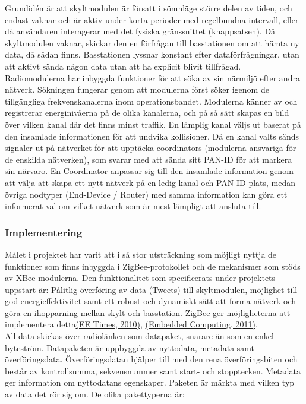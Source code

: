 \documentclass[a4paper,11pt]{article}
\begin{document}
Grundidén är att skyltmodulen är försatt i sömnläge större delen av tiden, och endast vaknar och är aktiv under korta perioder med regelbundna intervall, eller då användaren interagerar med det fysiska gränssnittet (knappsatsen). Då skyltmodulen vaknar, skickar den en förfrågan till basstationen om att hämta ny data, då sådan finns. Basstationen lyssnar konstant efter dataförfrågningar, utan att aktivt sända någon data utan att ha explicit blivit tillfrågad. \\

Radiomodulerna har inbyggda funktioner för att söka av sin närmiljö efter andra nätverk. Sökningen fungerar genom att modulerna först söker igenom de tillgängliga frekvenskanalerna inom operationsbandet. Modulerna känner av och registrerar energinivåerna på de olika kanalerna, och på så sätt skapas en bild över vilken kanal där det finns minst traffik. En lämplig kanal väljs ut baserat på den insamlade informationen för att undvika kollisioner. Då en kanal valts sänds signaler ut på nätverket för att upptäcka coordinators (modulerna ansvariga för de enskilda nätverken), som svarar med att sända sitt PAN-ID för att markera sin närvaro. En Coordinator anpassar sig till den insamlade information genom att välja att skapa ett nytt nätverk på en ledig kanal och PAN-ID-plats, medan övriga nodtyper (End-Device / Router) med samma information kan göra ett informerat val om vilket nätverk som är mest lämpligt att ansluta till.

\subsubsection{Implementering}
Målet i projektet har varit att i så stor utsträckning som möjligt nyttja de funktioner som finns inbyggda i ZigBee-protokollet och de mekanismer som stöds av XBee-modulerna.
Den funktionalitet som specificerats under projektets uppstart är: Pålitlig överföring av data (Tweets) till skyltmodulen, möjlighet till god energieffektivitet samt ett robust och dynamiskt sätt att forma nätverk och göra en ihopparning mellan skylt och basstation. ZigBee ger möjligheterna att implementera detta\hyperref[eetimes]{(EE Times, 2010)},  \hyperref[embedded]{(Embedded Computing, 2011)}. \\

All data skickas över radiolänken som datapaket, snarare än som en enkel byteström. Datapaketen är uppbyggda av nyttodata, metadata samt överföringsdata. Överföringsdatan hjälper till med den rena överföringsbiten och består av kontrollsumma, sekvensnummer samt start- och stopptecken. Metadata ger information om nyttodatans egenskaper.
Paketen är märkta med vilken typ av data det rör sig om. De olika pakettyperna är:
\end{document}
